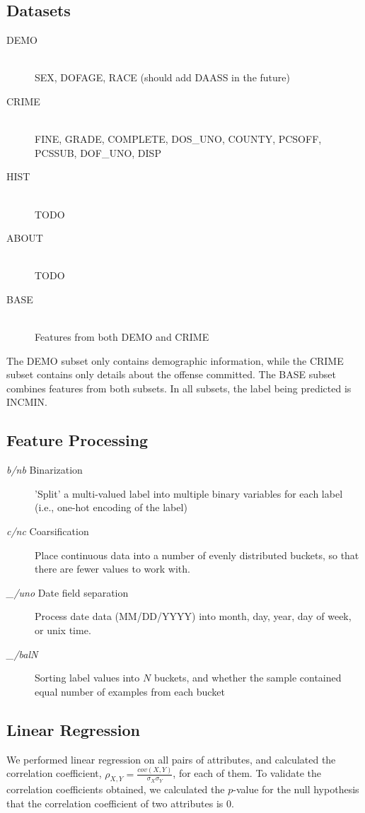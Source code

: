 \documentclass[11pt,letter]{article}
\begin{document}
\subsection{Datasets}
\begin{description}
	\item [DEMO] \hfill \\SEX, DOFAGE, RACE (should add DAASS in the future)
	\item [CRIME] \hfill \\FINE, GRADE, COMPLETE, DOS\_UNO, COUNTY, PCSOFF, PCSSUB, DOF\_UNO, DISP
	\item [HIST] \hfill \\TODO
	\item [ABOUT] \hfill \\TODO
	\item [BASE] \hfill \\Features from both DEMO and CRIME
\end{description}
The DEMO subset only contains demographic information, while the CRIME subset contains only details about the offense committed. The BASE subset combines features from both subsets. In all subsets, the label being predicted is INCMIN.

\subsection{Feature Processing}
\begin{description}
	\item [\emph{b/nb} Binarization] 'Split' a multi-valued label into multiple binary variables for each label (i.e., one-hot encoding of the label)
	\item [\emph{c/nc} Coarsification] Place continuous data into a number of evenly distributed buckets, so that there are fewer values to work with.
	\item [\emph{\_/uno} Date field separation] Process date data (MM/DD/YYYY) into month, day, year, day of week, or unix time.
	\item [\emph{\_/balN}] Sorting label values into $N$ buckets, and whether the sample contained equal number of examples from each bucket
\end{description}




\subsection{Linear Regression}
We performed linear regression on all pairs of attributes, and calculated the correlation coefficient, $\rho_{X,Y} = \frac{cov(X,Y)}{\sigma_X\sigma_Y}$, for each of them. To validate the correlation coefficients obtained, we calculated the $p$-value for the null hypothesis that the correlation coefficient of two attributes is 0.
\end{document}
